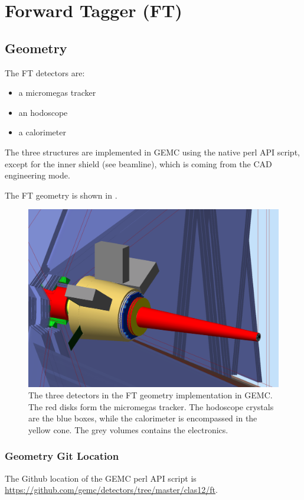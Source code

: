 \section{Forward Tagger (FT)}


\subsection{Geometry}

The FT detectors are:

\begin{itemize}
	\item a micromegas tracker
	\item an hodoscope
 	\item a calorimeter
\end{itemize}

The three structures are implemented in GEMC using the native perl API script, except for the inner shield (see beamline), which is coming from the CAD engineering mode.

The FT geometry is shown in .


\begin{figure}
	\centering
	\includegraphics[width=0.95\columnwidth,keepaspectratio]{img/ftGeometry.png}
	\caption{The three detectors in the FT geometry implementation in GEMC. The red disks form the micromegas tracker. The hodoscope crystals are the blue boxes,
            while the calorimeter is encompassed in the yellow cone. The grey volumes contains the electronics.}
	\label{fig:ftGeometry}
\end{figure}




\subsubsection{Geometry Git Location}
The Github location of the GEMC perl API script is \url{https://github.com/gemc/detectors/tree/master/clas12/ft}.


